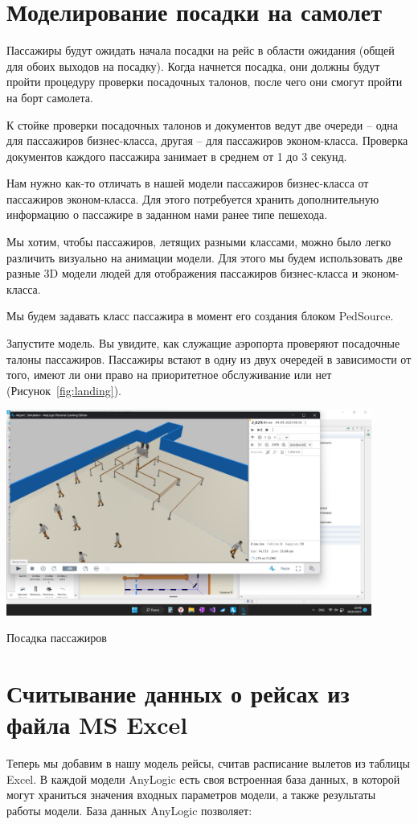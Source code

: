 \section{Моделирование посадки на самолет}
Пассажиры будут ожидать начала посадки на рейс в области ожидания (общей
для обоих выходов на посадку). Когда начнется посадка, они должны будут
пройти процедуру проверки посадочных талонов, после чего они смогут пройти
на борт самолета.\par
К стойке проверки посадочных талонов и документов ведут две очереди – одна
для пассажиров бизнес-класса, другая – для пассажиров эконом-класса.
Проверка документов каждого пассажира занимает в среднем от 1 до 3 секунд.\par
Нам нужно как-то отличать в нашей модели пассажиров бизнес-класса от
пассажиров эконом-класса. Для этого потребуется хранить дополнительную
информацию о пассажире в заданном нами ранее типе пешехода.\par
Мы хотим, чтобы пассажиров, летящих разными классами, можно было легко
различить визуально на анимации модели. Для этого мы будем использовать
две разные 3D модели людей для отображения пассажиров бизнес-класса и
эконом-класса.\par
Мы будем задавать класс пассажира в момент его создания блоком PedSource.\par
Запустите модель. Вы увидите, как служащие аэропорта проверяют
посадочные талоны пассажиров. Пассажиры встают в одну из двух очередей
в зависимости от того, имеют ли они право на приоритетное обслуживание
или нет (Рисунок~\ref{fig:landing}).

\begin{image}
	\includegraphics[width=0.9\textwidth]{2023-04-08 (2)}
	\caption{Посадка пассажиров}
	\label{fig:landing}
\end{image}

\section{Считывание данных о рейсах из файла MS Excel}
Теперь мы добавим в нашу модель рейсы, считав расписание вылетов из
таблицы Excel.
В каждой модели AnyLogic есть своя встроенная база данных, в которой могут
храниться значения входных параметров модели, а также результаты работы
модели.
База данных AnyLogic позволяет:


